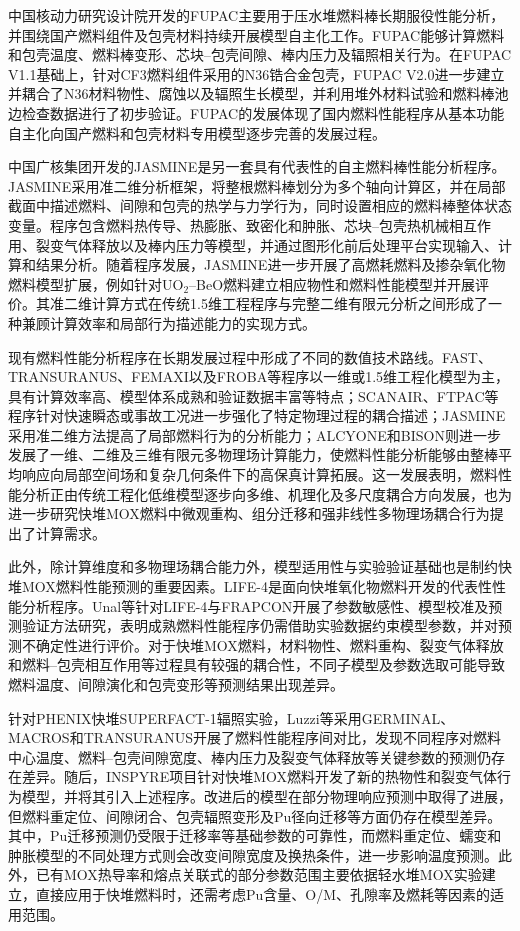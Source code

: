 中国核动力研究设计院开发的FUPAC主要用于压水堆燃料棒长期服役性能分析，并围绕国产燃料组件及包壳材料持续开展模型自主化工作。FUPAC能够计算燃料和包壳温度、燃料棒变形、芯块--包壳间隙、棒内压力及辐照相关行为。在FUPAC V1.1基础上，针对CF3燃料组件采用的N36锆合金包壳，FUPAC V2.0进一步建立并耦合了N36材料物性、腐蚀以及辐照生长模型，并利用堆外材料试验和燃料棒池边检查数据进行了初步验证\cite{xingFuelRodAnalysis2021}。FUPAC的发展体现了国内燃料性能程序从基本功能自主化向国产燃料和包壳材料专用模型逐步完善的发展过程。

中国广核集团开发的JASMINE是另一套具有代表性的自主燃料棒性能分析程序。JASMINE采用准二维分析框架，将整根燃料棒划分为多个轴向计算区，并在局部截面中描述燃料、间隙和包壳的热学与力学行为，同时设置相应的燃料棒整体状态变量\cite{weiModelingFuelRodJASMINE2017}。程序包含燃料热传导、热膨胀、致密化和肿胀、芯块--包壳热机械相互作用、裂变气体释放以及棒内压力等模型，并通过图形化前后处理平台实现输入、计算和结果分析。随着程序发展，JASMINE进一步开展了高燃耗燃料及掺杂氧化物燃料模型扩展，例如针对UO$_2$--BeO燃料建立相应物性和燃料性能模型并开展评价\cite{wangAnalysisAssessmentBeO2024}。其准二维计算方式在传统1.5维工程程序与完整二维有限元分析之间形成了一种兼顾计算效率和局部行为描述能力的实现方式。

现有燃料性能分析程序在长期发展过程中形成了不同的数值技术路线。FAST、TRANSURANUS、FEMAXI以及FROBA等程序以一维或1.5维工程化模型为主，具有计算效率高、模型体系成熟和验证数据丰富等特点；SCANAIR、FTPAC等程序针对快速瞬态或事故工况进一步强化了特定物理过程的耦合描述；JASMINE采用准二维方法提高了局部燃料行为的分析能力；ALCYONE和BISON则进一步发展了一维、二维及三维有限元多物理场计算能力，使燃料性能分析能够由整棒平均响应向局部空间场和复杂几何条件下的高保真计算拓展。这一发展表明，燃料性能分析正由传统工程化低维模型逐步向多维、机理化及多尺度耦合方向发展，也为进一步研究快堆MOX燃料中微观重构、组分迁移和强非线性多物理场耦合行为提出了计算需求。

此外，除计算维度和多物理场耦合能力外，模型适用性与实验验证基础也是制约快堆MOX燃料性能预测的重要因素。LIFE-4是面向快堆氧化物燃料开发的代表性性能分析程序。Unal等\cite{unalApplicationAdvancedValidation2013}针对LIFE-4与FRAPCON开展了参数敏感性、模型校准及预测验证方法研究，表明成熟燃料性能程序仍需借助实验数据约束模型参数，并对预测不确定性进行评价。对于快堆MOX燃料，材料物性、燃料重构、裂变气体释放和燃料--包壳相互作用等过程具有较强的耦合性，不同子模型及参数选取可能导致燃料温度、间隙演化和包壳变形等预测结果出现差异。

针对PHENIX快堆SUPERFACT-1辐照实验，Luzzi\cite{luzziAssessmentThreeEuropean2021,luzziAssessmentINSPYREextendedFuel2023}等采用GERMINAL、MACROS和TRANSURANUS开展了燃料性能程序间对比，发现不同程序对燃料中心温度、燃料--包壳间隙宽度、棒内压力及裂变气体释放等关键参数的预测仍存在差异。随后，INSPYRE项目针对快堆MOX燃料开发了新的热物性和裂变气体行为模型，并将其引入上述程序。改进后的模型在部分物理响应预测中取得了进展，但燃料重定位、间隙闭合、包壳辐照变形及Pu径向迁移等方面仍存在模型差异。其中，Pu迁移预测仍受限于迁移率等基础参数的可靠性，而燃料重定位、蠕变和肿胀模型的不同处理方式则会改变间隙宽度及换热条件，进一步影响温度预测。此外，已有MOX热导率和熔点关联式的部分参数范围主要依据轻水堆MOX实验建立，直接应用于快堆燃料时，还需考虑Pu含量、O/M、孔隙率及燃耗等因素的适用范围\cite{magniModellingAssessmentThermal2020}。

